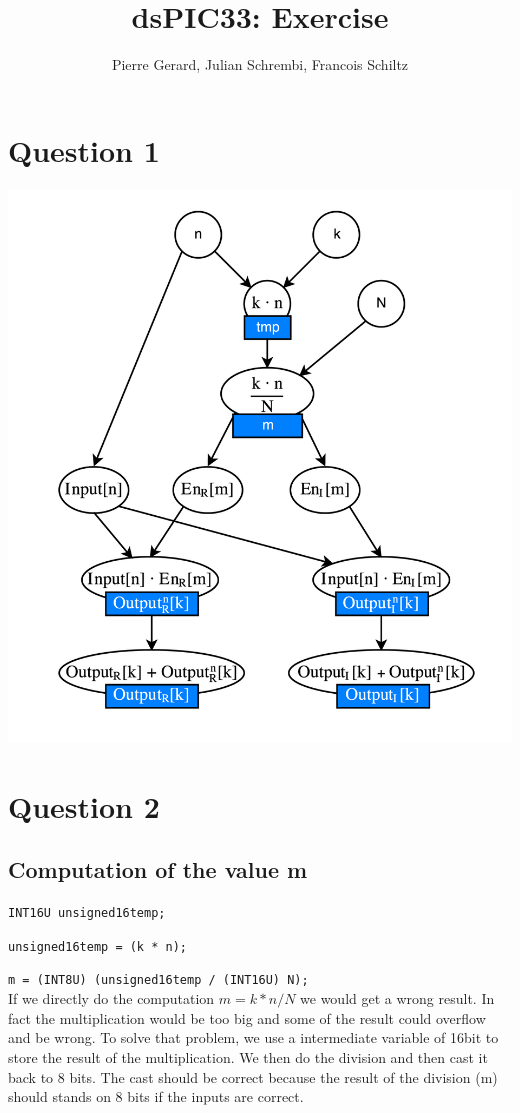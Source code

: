 \documentclass[a4paper]{article}
\title{dsPIC33: Exercise}
\author{Pierre Gerard, Julian Schrembi, Francois Schiltz}
\begin{document}
\maketitle

\section{Question 1}

\includegraphics[scale=1]{files/elect-01.png} 

\section{Question 2}

\subsection{Computation of the value m}


\verb|INT16U unsigned16temp;|

\verb|unsigned16temp = (k * n);|

\verb|m = (INT8U) (unsigned16temp / (INT16U) N);|
\\

If we directly do the computation $ m = k*n/N $ we would get a wrong result. In fact the multiplication would be too big and some of the result could overflow and be wrong. To solve that problem, we use a intermediate variable of 16bit to store the result of the multiplication. We then do the division and then cast it back to 8 bits. The cast should be correct because the result of the division (m) should stands on 8 bits if the inputs are correct.
\end{document}
